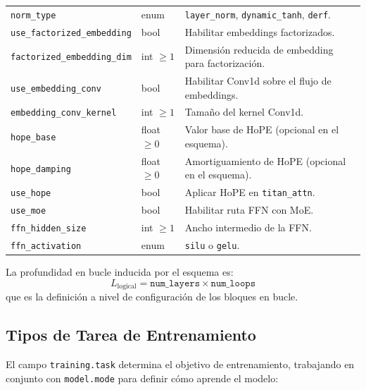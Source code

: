 \begin{longtable}{p{5.1cm}p{2.4cm}p{7.0cm}}
\texttt{norm\_type} & enum & \texttt{layer\_norm}, \texttt{dynamic\_tanh}, \texttt{derf}. \\
\texttt{use\_factorized\_embedding} & bool & Habilitar embeddings factorizados. \\
\texttt{factorized\_embedding\_dim} & int $\ge 1$ & Dimensión reducida de embedding para factorización. \\
\texttt{use\_embedding\_conv} & bool & Habilitar Conv1d sobre el flujo de embeddings. \\
\texttt{embedding\_conv\_kernel} & int $\ge 1$ & Tamaño del kernel Conv1d. \\
\texttt{hope\_base} & float $\ge 0$ & Valor base de HoPE (opcional en el esquema). \\
\texttt{hope\_damping} & float $\ge 0$ & Amortiguamiento de HoPE (opcional en el esquema). \\
\texttt{use\_hope} & bool & Aplicar HoPE en \texttt{titan\_attn}. \\
\texttt{use\_moe} & bool & Habilitar ruta FFN con MoE. \\
\texttt{ffn\_hidden\_size} & int $\ge 1$ & Ancho intermedio de la FFN. \\
\texttt{ffn\_activation} & enum & \texttt{silu} o \texttt{gelu}. \\
\bottomrule
\end{longtable}
\normalsize

La profundidad en bucle inducida por el esquema es:
\[
L_{\text{logical}} = \texttt{num\_layers} \times \texttt{num\_loops}
\]
que es la definición a nivel de configuración de los bloques en bucle.

\subsection{Tipos de Tarea de Entrenamiento}

El campo \texttt{training.task} determina el objetivo de entrenamiento, trabajando en conjunto con \texttt{model.mode} para definir cómo aprende el modelo:

